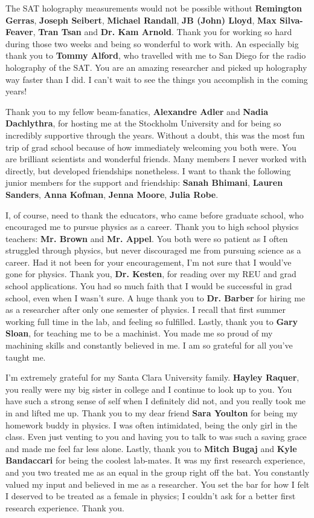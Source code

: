 \documentclass{ucetd}
\begin{document}
The SAT holography measurements would not be possible without \textbf{Remington Gerras}, \textbf{Joseph Seibert}, \textbf{Michael Randall}, \textbf{JB (John) Lloyd}, \textbf{Max Silva-Feaver}, \textbf{Tran Tsan} and \textbf{Dr. Kam Arnold}.  Thank you for working so hard during those two weeks and being so wonderful to work with.  An especially big thank you to \textbf{Tommy Alford}, who travelled with me to San Diego for the radio holography of the SAT.  You are an amazing researcher and picked up holography way faster than I did.  I can't wait to see the things you accomplish in the coming years!

Thank you to my fellow beam-fanatics, \textbf{Alexandre Adler} and \textbf{Nadia Dachlythra}, for hosting me at the Stockholm University and for being so incredibly supportive through the years.  Without a doubt, this was the most fun trip of grad school because of how immediately welcoming you both were.  You are brilliant scientists and wonderful friends.  Many members I never worked with directly, but developed friendships nonetheless.  I want to thank the following junior members for the support and friendship: \textbf{Sanah Bhimani}, \textbf{Lauren Sanders}, \textbf{Anna Kofman}, \textbf{Jenna Moore}, \textbf{Julia Robe}.

I, of course, need to thank the educators, who came before graduate school, who encouraged me to pursue physics as a career.  Thank you to high school physics teachers: \textbf{Mr. Brown} and \textbf{Mr. Appel}.  You both were so patient as I often struggled through physics, but never discouraged me from pursuing science as a career.  Had it not been for your encouragement, I'm not sure that I would've gone for physics.  Thank you, \textbf{Dr. Kesten}, for reading over my REU and grad school applications.  You had so much faith that I would be successful in grad school, even when I wasn't sure.  A huge thank you to \textbf{Dr. Barber} for hiring me as a researcher after only one semester of physics.  I recall that first summer working full time in the lab, and feeling so fulfilled.  Lastly, thank you to \textbf{Gary Sloan}, for teaching me to be a machinist.  You made me so proud of my machining skills and constantly believed in me.  I am so grateful for all you've taught me.

I'm extremely grateful for my Santa Clara University family.  \textbf{Hayley Raquer}, you really were my big sister in college and I continue to look up to you.  You have such a strong sense of self when I definitely did not, and you really took me in and lifted me up.  Thank you to my dear friend \textbf{Sara Youlton} for being my homework buddy in physics.  I was often intimidated, being the only girl in the class.  Even just venting to you and having you to talk to was such a saving grace and made me feel far less alone.  Lastly, thank you to \textbf{Mitch Bugaj} and \textbf{Kyle Bandaccari} for being the coolest lab-mates.  It was my first research experience, and you two treated me as an equal in the group right off the bat.  You constantly valued my input and believed in me as a researcher.  You set the bar for how I felt I deserved to be treated as a female in physics; I couldn't ask for a better first research experience.  Thank you.
\end{document}
